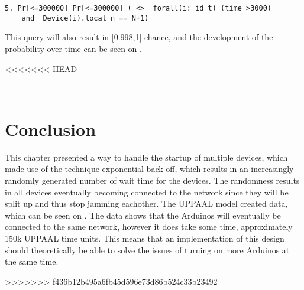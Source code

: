 \begin{lstlisting}[style=UPPAAL, title={This query asks after 3000 UPPAAL time units has passed, what then is the probability that a device \texttt{i} has a local value of \texttt{n} to be equal to the number of devices, which is \texttt{N} + 1, which means that all devices are in the same network.}]
5. Pr[<=300000] Pr[<=300000] ( <>  forall(i: id_t) (time >3000) 
	and  Device(i).local_n == N+1)
\end{lstlisting}

\noindent This query will also result in [0.998,1] chance, and the development of the probability over time can be seen on .


<<<<<<< HEAD

=======
\section{Conclusion}

This chapter presented a way to handle the startup of multiple devices, which made use of the technique exponential back-off, which results in an increasingly randomly generated number of wait time for the devices. 
The randomness results in all devices eventually becoming connected to the network since they will be split up and thus stop jamming eachother.
The UPPAAL model created data, which can be seen on .
The data shows that the Arduinos will eventually be connected to the same network, however it does take some time, approximately 150k UPPAAL time units.
This means that an implementation of this design should theoretically be able to solve the issues of turning on more Arduinos at the same time.


>>>>>>> f436b12b495a6fb45d596e73d86b524c33b23492
